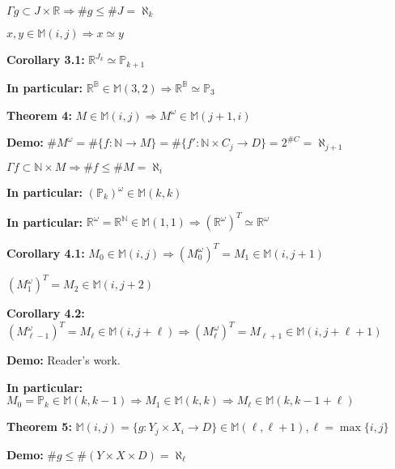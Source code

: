 \documentclass[10pt,a4paper]{article}
\begin{document}
$\Gamma g \subset J \times \mathbb{R} \Rightarrow \# g \le \# J = \aleph_k$

\vspace{3mm}

$x, y \in \mathbb{M}(i,j) \Rightarrow x \simeq y$

\textbf{Corollary 3.1:} $\mathbb{R}^{J_k} \simeq \mathbb{P}_{k + 1}$

\vspace{3mm}

\textbf{In particular:} $\mathbb{R}^\mathbb{B} \in \mathbb{M}(3, 2) \Rightarrow \mathbb{R}^\mathbb{B} \simeq \mathbb{P}_3$

\vspace{3mm}

\textbf{Theorem 4:} $M \in \mathbb{M}(i,j) \Rightarrow M^\omega \in \mathbb{M}(j+1, i)$

\textbf{Demo:} $\# M^\omega = \# \{ f : \mathbb{N} \rightarrow M \} = \# \{ f' : \mathbb{N} \times C_j \rightarrow D \} = 2^{\#C} = \aleph_{j + 1}$

$\Gamma f \subset \mathbb{N} \times M \Rightarrow \# f \le \# M = \aleph_i$

\vspace{3mm}

\textbf{In particular:} $(\mathbb{P}_k)^\omega \in \mathbb{M}(k, k)$

\textbf{In particular:} $\mathbb{R}^\omega = \mathbb{R}^\mathbb{N} \in \mathbb{M}(1, 1) \Rightarrow (\mathbb{R}^\omega)^T \simeq \mathbb{R}^\omega$

\textbf{Corollary 4.1:} $M_0 \in \mathbb{M}(i, j) \Rightarrow (M_0^\omega)^T = M_1 \in \mathbb{M}(i, j+1)$

$(M_1^\omega)^T = M_2 \in \mathbb{M}(i, j+2)$

\textbf{Corollary 4.2:} $(M_{\ell-1}^\omega)^T = M_\ell \in \mathbb{M}(i, j+\ell) \Rightarrow (M_\ell^\omega)^T = M_{\ell+1} \in \mathbb{M}(i, j+\ell+1)$

\textbf{Demo:} Reader's work.

\textbf{In particular:} $ M_0 = \mathbb{P}_k \in \mathbb{M}(k, k-1) \Rightarrow M_1 \in \mathbb{M}(k, k) \Rightarrow M_\ell \in \mathbb{M}(k, k - 1 + \ell)$

\vspace{3mm}

\textbf{Theorem 5:} $\mathbb{M}(i, j) = \{ g : Y_j \times X_i \rightarrow D \} \in \mathbb{M}(\ell, \ell + 1), \ell = \max\{ i, j \}$

\textbf{Demo:} $\# g \le \# (Y \times X \times D) = \aleph_\ell$
\end{document}
